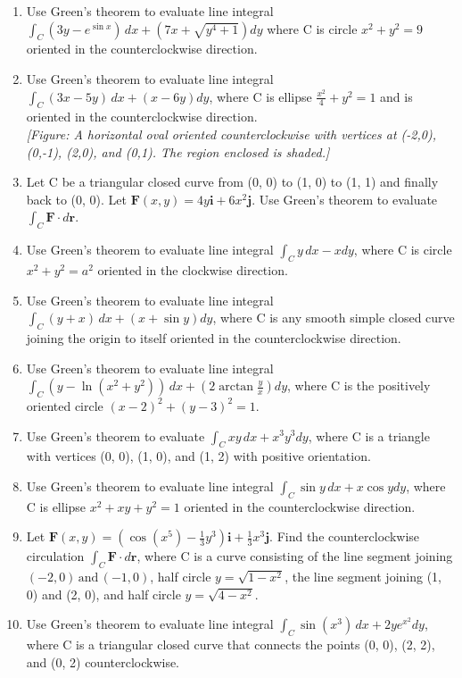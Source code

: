 \documentclass{exercises}
\begin{document}
\begin{enumerate}[resume]
\item Use Green's theorem to evaluate line integral $\int_{C}^{}(3y-e^{\sin x})\,dx+(7x+\sqrt{y^{4}+1})dy$ where C is circle $x^{2}+y^{2}=9$ oriented in the counterclockwise direction.
\item Use Green's theorem to evaluate line integral $\int_{C}^{}(3x-5y)\,dx+(x-6y)dy$, where C is ellipse $\frac{x^{2}}{4}+y^{2}=1$ and is oriented in the counterclockwise direction. \\ \textit{[Figure: A horizontal oval oriented counterclockwise with vertices at (-2,0), (0,-1), (2,0), and (0,1). The region enclosed is shaded.]}
\item Let C be a triangular closed curve from (0, 0) to (1, 0) to (1, 1) and finally back to (0, 0). Let $\mathbf{F}(x,y)=4y\mathbf{i}+6x^{2}\mathbf{j}$. Use Green's theorem to evaluate $\int_{C}\mathbf{F}\cdot d\mathbf{r}$.
\item Use Green's theorem to evaluate line integral $\int_{C}y\,dx-xdy$, where C is circle $x^{2}+y^{2}=a^{2}$ oriented in the clockwise direction.
\item Use Green's theorem to evaluate line integral $\int_{C}(y+x)\,dx+(x+\sin y)dy$, where C is any smooth simple closed curve joining the origin to itself oriented in the counterclockwise direction.
\item Use Green's theorem to evaluate line integral $\int_{C}(y-\ln(x^{2}+y^{2}))\,dx+(2\arctan \frac{y}{x})dy$, where C is the positively oriented circle ${(x-2)}^{2}+{(y-3)}^{2}=1$.
\item Use Green's theorem to evaluate $\int_{C}xy\,dx+x^{3}y^{3}dy$, where C is a triangle with vertices (0, 0), (1, 0), and (1, 2) with positive orientation.
\item Use Green's theorem to evaluate line integral $\int_{C}^{}\sin y\,dx+x\cos ydy$, where C is ellipse $x^{2}+xy+y^{2}=1$ oriented in the counterclockwise direction.
\item Let $\mathbf{F}(x,y)=\left(\cos(x^{5})-\frac{1}{3}y^{3}\right)\mathbf{i}+\frac{1}{3}x^{3}\mathbf{j}$. Find the counterclockwise circulation $\int_{C}\mathbf{F}\cdot d\mathbf{r}$, where C is a curve consisting of the line segment joining $(-2,0)\,\text{and}\,(-1,0)$, half circle $y=\sqrt{1-x^{2}}$, the line segment joining (1, 0) and (2, 0), and half circle $y=\sqrt{4-x^{2}}$.
\item Use Green's theorem to evaluate line integral $\int_{C}^{}\sin(x^{3})\,dx+2ye^{x^{2}}dy$, where C is a triangular closed curve that connects the points (0, 0), (2, 2), and (0, 2) counterclockwise.

\end{enumerate}
\end{document}
